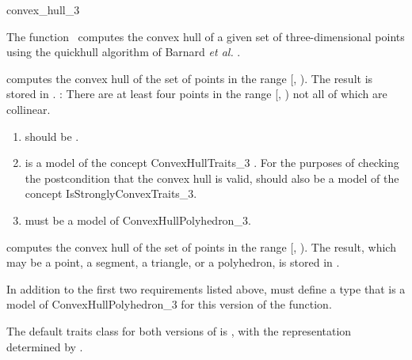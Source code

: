 \begin{ccRefFunction}{convex_hull_3}

The function \ccRefName\ computes the convex hull of a given set of 
three-dimensional points using the quickhull algorithm of Barnard
\textit{et al.} \cite{bdh-qach-96}.


{
computes the convex hull of the set of points in the range
[, ).  The result is stored in .
\ccPrecond: There are at least four points in the range 
[, ) not all of which are collinear.
}

\begin{enumerate}
   \item {} should be .
   \item {} is a model of the concept ConvexHullTraits\_3
         .
         For the purposes of checking the postcondition that the convex hull
         is valid,  should also be a model of the concept
         IsStronglyConvexTraits\_3.
  \item {} must be a model of ConvexHullPolyhedron\_3.
\end{enumerate}

{
computes the convex hull of the set of points in the range
[, ).  The result, which may be a point, a segment,
a triangle, or a polyhedron, is stored in .
}

In addition to the first two requirements listed above,  must
define a type  that is a model of ConvexHullPolyhedron\_3
for this version of the function. 

The default traits class for both versions of  is 
,%
with the representation determined by .


\end{ccRefFunction}
